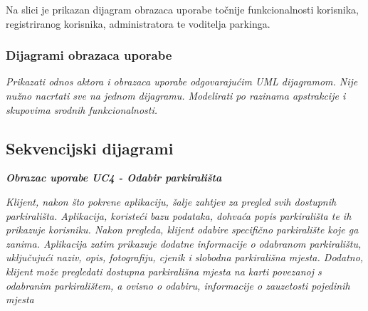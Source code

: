 			{ Na slici je prikazan dijagram obrazaca uporabe točnije funkcionalnosti korisnika, registriranog korisnika, administratora te voditelja parkinga. }
				
			\begin{figure}[]
				\centering
				\label{fig:spotPicker}
			\end{figure}
			\pagebreak
					
				\subsubsection{Dijagrami obrazaca uporabe}
					
					\textit{Prikazati odnos aktora i obrazaca uporabe odgovarajućim UML dijagramom. Nije nužno nacrtati sve na jednom dijagramu. Modelirati po razinama apstrakcije i skupovima srodnih funkcionalnosti.}
				\eject		
				
			\subsection{Sekvencijski dijagrami}
				
				 \textbf{\textit{Obrazac uporabe UC4 - Odabir parkirališta}}
				  
				
				 \textit{Klijent, nakon što pokrene aplikaciju, šalje zahtjev za pregled svih dostupnih parkirališta. Aplikacija, koristeći bazu podataka, dohvaća popis parkirališta te ih prikazuje korisniku. Nakon pregleda, klijent odabire specifično parkiralište koje ga zanima. Aplikacija zatim prikazuje dodatne informacije o odabranom parkiralištu, uključujući naziv, opis, fotografiju, cjenik i slobodna parkirališna mjesta. Dodatno, klijent može pregledati dostupna parkirališna mjesta na karti povezanoj s odabranim parkiralištem, a ovisno o odabiru, informacije o zauzetosti pojedinih mjesta}
				    
